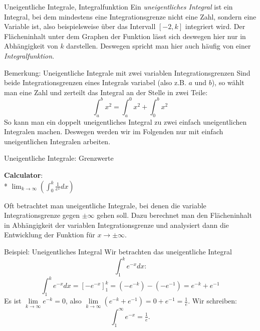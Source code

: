 \begin{bla}{Uneigentliche Integrale, Integralfunktion}
  Ein \emph{uneigentliches Integral} ist ein Integral, bei dem mindestens eine Integrationsgrenze nicht eine Zahl, sondern eine Variable ist, also beispielsweise über das Intervall $[-2,k]$ integriert wird. Der Flächeninhalt unter dem Graphen der Funktion lässt sich deswegen hier nur in Abhängigkeit von $k$ darstellen. Deswegen spricht man hier auch häufig von einer \emph{Integralfunktion}.
\end{bla}

\begin{bla}{Bemerkung: Uneigentliche Integrale mit zwei variablen Integrationsgrenzen}
  Sind beide Integrationsgrenzen eines Integrals variabel (also z.B. $a$ und $b$), so wählt man eine Zahl und zerteilt das Integral an der Stelle in zwei Teile:
  \begin{equation*}
    \int_a^b x^2 =\int_a^0 x^2 + \int_0^b x^2
  \end{equation*}
  So kann man ein doppelt uneigentliches Integral zu zwei einfach uneigentlichen Integralen machen. Deswegen werden wir im Folgenden nur mit einfach uneigentlichen Integralen arbeiten.
\end{bla}

\begin{bla}{Uneigentliche Integrale: Grenzwerte}
  \begin{marginfigure}[5em]
    \begin{tcolorbox}[colback=white!95!black,colframe=white!75!black,title=CAS:,arc=0mm]
      \begin{scriptsize}
        \textbf{Calculator}: \\*
        \hfill \( \lim_{k \to \infty} \left( \int_0^k \tfrac{1}{e^x} dx \right) \)
      \end{scriptsize}
    \end{tcolorbox}
  \end{marginfigure}
  Oft betrachtet man uneigentliche Integrale, bei denen die variable Integrationsgrenze gegen $\pm \infty$ gehen soll. Dazu berechnet man den Flächeninhalt in Abhängigkeit der variablen Integrationsgrenze und analysiert dann die Entwicklung der Funktion für $x\rightarrow\pm\infty$.
\end{bla}

\clearpage

\begin{bla}{Beispiel: Uneigentliches Integral}
  Wir betrachten das uneigentliche Integral
  \begin{equation*}
    \int_1^k e^{-x} dx\text{:}
  \end{equation*}
  \begin{equation*}
    \int_1^k e^{-x} dx = {[-e^{-x}]}_1^k=\left(-e^{-k}\right)-\left(-e^{-1}\right)=e^{-k}+e^{-1}
  \end{equation*}
  Es ist $\lim\limits_{k \to \infty} e^{-k}=0$, also $\lim\limits_{k \to \infty}\left(e^{-k}+e^{-1}\right)=0+e^{-1}=\tfrac{1}{e}$. Wir schreiben:
  \begin{equation*}
    \int_1^\infty e^{-x} = \tfrac{1}{e}\text{.}
  \end{equation*}
\end{bla}


